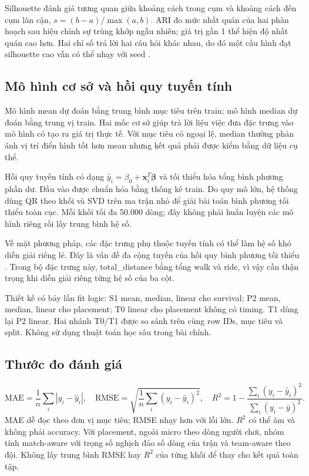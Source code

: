\documentclass[12pt,a4paper]{article}
\begin{document}
Silhouette đánh giá tương quan giữa khoảng cách trong cụm và khoảng cách đến cụm lân cận, $s=(b-a)/\max(a,b)$. ARI đo mức nhất quán của hai phân hoạch sau hiệu chỉnh sự trùng khớp ngẫu nhiên; giá trị gần 1 thể hiện độ nhất quán cao hơn. Hai chỉ số trả lời hai câu hỏi khác nhau, do đó một cấu hình đạt silhouette cao vẫn có thể nhạy với seed \cite{skcluster}.
\subsection{Mô hình cơ sở và hồi quy tuyến tính}
Mô hình mean dự đoán bằng trung bình mục tiêu trên train; mô hình median dự đoán bằng trung vị train. Hai mốc cơ sở giúp trả lời liệu việc đưa đặc trưng vào mô hình có tạo ra giá trị thực tế. Với mục tiêu có ngoại lệ, median thường phản ánh vị trí điển hình tốt hơn mean nhưng kết quả phải được kiểm bằng dữ liệu cụ thể.

Hồi quy tuyến tính có dạng $\hat y_i=\beta_0+\boldsymbol{x}_i^T\boldsymbol{\beta}$ và tối thiểu hóa tổng bình phương phần dư. Đầu vào được chuẩn hóa bằng thống kê train. Do quy mô lớn, hệ thống dùng QR theo khối và SVD trên ma trận nhỏ để giải bài toán bình phương tối thiểu toàn cục. Mỗi khối tối đa 50.000 dòng; đây không phải huấn luyện các mô hình riêng rồi lấy trung bình hệ số.

Về mặt phương pháp, các đặc trưng phụ thuộc tuyến tính có thể làm hệ số khó diễn giải riêng lẻ. Đây là vấn đề đa cộng tuyến của hồi quy bình phương tối thiểu \cite{sklinear}. Trong bộ đặc trưng này, total\_distance bằng tổng walk và ride, vì vậy cần thận trọng khi diễn giải riêng từng hệ số của ba cột.

Thiết kế có bảy lần fit logic: S1 mean, median, linear cho survival; P2 mean, median, linear cho placement; T0 linear cho placement không có timing. T1 dùng lại P2 linear. Hai nhánh T0/T1 được so sánh trên cùng row IDs, mục tiêu và split. Không sử dụng thuật toán học sâu trong bài chính.
\subsection{Thước đo đánh giá}
\[
\mathrm{MAE}=\frac1n\sum_i|y_i-\hat y_i|,\quad
\mathrm{RMSE}=\sqrt{\frac1n\sum_i(y_i-\hat y_i)^2},\quad
R^2=1-\frac{\sum_i(y_i-\hat y_i)^2}{\sum_i(y_i-\bar y)^2}.
\]
MAE dễ đọc theo đơn vị mục tiêu; RMSE nhạy hơn với lỗi lớn. $R^2$ có thể âm và không phải accuracy. Với placement, ngoài micro theo dòng người chơi, nhóm tính match-aware với trọng số nghịch đảo số dòng của trận và team-aware theo đội. Không lấy trung bình RMSE hay $R^2$ của từng khối để thay cho kết quả toàn tập.
\end{document}
